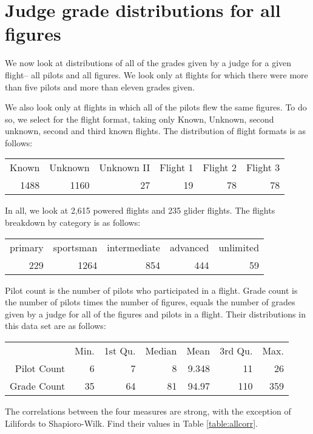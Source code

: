 \section{Judge grade distributions for all figures}

We now look at distributions of all of the grades given by a judge for
a given flight-- all pilots and all figures. We look only at flights for
which there were more than five pilots and more than eleven grades given.

We also look only at flights in which all of the pilots flew the same figures.
To do so, we select for the flight format, taking only Known, Unknown, second
unknown, second and third known flights. The distribution of flight formats is
as follows:

\begin{tabular}{r r r r r r}
Known & Unknown & Unknown II  &  Flight 1  & Flight 2 & Flight 3  \\
1488  & 1160 & 27  & 19  & 78 & 78  \\
\end{tabular}

In all, we look at 2,615 powered flights and 235 glider flights. The flights
breakdown by category is as follows:

\begin{tabular}{r r r r r}
primary  & sportsman & intermediate  &  advanced  & unlimited  \\
    229  &      1264 &          854  &       444  &        59  \\
\end{tabular}

Pilot count is the number of pilots who participated in a flight.
Grade count is the number of pilots times the number of figures, equals
the number of grades given by a judge for all of the figures and pilots in
a flight. Their distributions in this data set are as follows:

\begin{tabular}{r | r r r r r r}
& Min. & 1st Qu. & Median & Mean & 3rd Qu. & Max. \\
Pilot Count &  6 &  7 &  8 & 9.348 &  11 &  26 \\
Grade Count & 35 & 64 & 81 & 94.97 & 110 & 359 \\
\end{tabular}

The correlations between the four measures are strong, with the exception
of Lilifords to Shapioro-Wilk. Find their values in Table \ref{table:allcorr}.

